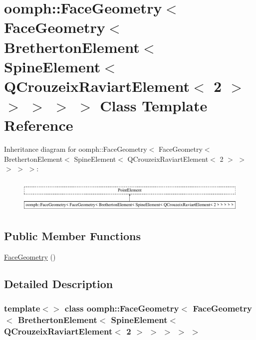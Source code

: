 \hypertarget{classoomph_1_1FaceGeometry_3_01FaceGeometry_3_01BrethertonElement_3_01SpineElement_3_01QCrouzeix098df2efac952001ec21ccc10b121ae7}{}\section{oomph\+:\+:Face\+Geometry$<$ Face\+Geometry$<$ Bretherton\+Element$<$ Spine\+Element$<$ Q\+Crouzeix\+Raviart\+Element$<$ 2 $>$ $>$ $>$ $>$ $>$ Class Template Reference}
\label{classoomph_1_1FaceGeometry_3_01FaceGeometry_3_01BrethertonElement_3_01SpineElement_3_01QCrouzeix098df2efac952001ec21ccc10b121ae7}
Inheritance diagram for oomph\+:\+:Face\+Geometry$<$ Face\+Geometry$<$ Bretherton\+Element$<$ Spine\+Element$<$ Q\+Crouzeix\+Raviart\+Element$<$ 2 $>$ $>$ $>$ $>$ $>$\+:\begin{figure}[H]
\begin{center}
\leavevmode
\includegraphics[height=1.649485cm]{classoomph_1_1FaceGeometry_3_01FaceGeometry_3_01BrethertonElement_3_01SpineElement_3_01QCrouzeix098df2efac952001ec21ccc10b121ae7}
\end{center}
\end{figure}
\subsection*{Public Member Functions}
\begin{DoxyCompactItemize}
\item 
\hyperlink{classoomph_1_1FaceGeometry_3_01FaceGeometry_3_01BrethertonElement_3_01SpineElement_3_01QCrouzeix098df2efac952001ec21ccc10b121ae7_a52eb404b07af95adc77be5b560f7186b}{Face\+Geometry} ()
\end{DoxyCompactItemize}


\subsection{Detailed Description}
\subsubsection*{template$<$$>$\newline
class oomph\+::\+Face\+Geometry$<$ Face\+Geometry$<$ Bretherton\+Element$<$ Spine\+Element$<$ Q\+Crouzeix\+Raviart\+Element$<$ 2 $>$ $>$ $>$ $>$ $>$}

